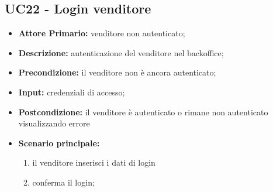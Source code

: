 \subsection{UC22 - Login venditore}
\begin{itemize}
    \item \textbf{Attore Primario:} venditore non autenticato;
    \item \textbf{Descrizione:} autenticazione del venditore nel backoffice;
    \item \textbf{Precondizione:} il venditore non è ancora autenticato;
    \item \textbf{Input:} credenziali di accesso;
    \item \textbf{Postcondizione:} il venditore è autenticato o rimane non autenticato visualizzando errore
    \item \textbf{Scenario principale:}
    \begin{enumerate}
        \item il venditore inserisci i dati di login
        \item conferma il login;
    \end{enumerate}
\end{itemize}